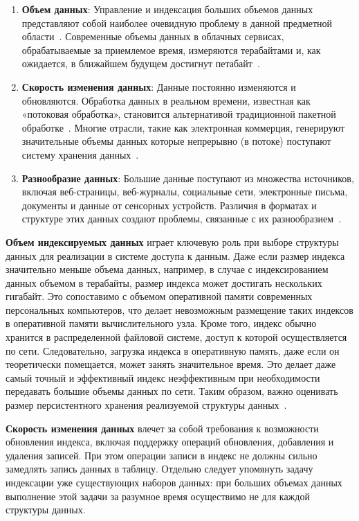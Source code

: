 \begin{enumerate}
    \item \textbf{Объем данных}: Управление и индексация больших объемов данных представляют собой наиболее очевидную проблему в данной предметной области~\cite{Big_data_challenge}. Современные объемы данных в облачных сервисах, обрабатываемые за приемлемое время, измеряются терабайтами и, как ожидается, в ближайшем будущем достигнут петабайт~\cite{Big_data_issues_challenges_tools}.
    \item \textbf{Скорость изменения данных}: Данные постоянно изменяются и обновляются. Обработка данных в реальном времени, известная как «потоковая обработка», становится альтернативой традиционной пакетной обработке~\cite{Big_data_challenge}. Многие отрасли, такие как электронная коммерция, генерируют значительные объемы данных которые непрерывно (в потоке) поступают систему хранения данных~\cite{Big_data_Issues_and_challenges}. 
    \item \textbf{Разнообразие данных}: Большие данные поступают из множества источников, включая веб-страницы, веб-журналы, социальные сети, электронные письма, документы и данные от сенсорных устройств. Различия в форматах и структуре этих данных создают проблемы, связанные с их разнообразием~\cite{Addressing_big_data_variety}.
\end{enumerate}

\textbf{Объем индексируемых данных} играет ключевую роль при выборе структуры данных для реализации в системе доступа к данным. Даже если размер индекса значительно меньше объема данных, например, в случае с индексированием данных объемом в терабайты, размер индекса может достигать нескольких гигабайт. Это сопоставимо с объемом оперативной памяти современных персональных компьютеров, что делает невозможным размещение таких индексов в оперативной памяти вычислительного узла. Кроме того, индекс обычно хранится в распределенной файловой системе, доступ к которой осуществляется по сети. Следовательно, загрузка индекса в оперативную память, даже если он теоретически помещается, может занять значительное время. Это делает даже самый точный и эффективный индекс неэффективным при необходимости передавать большие объемы данных по сети. Таким образом, важно оценивать размер персистентного хранения реализуемой структуры данных~\cite{Big_data_issues_challenges_tools}.

\textbf{Скорость изменения данных} влечет за собой требования к возможности обновления индекса, включая поддержку операций обновления, добавления и удаления записей. При этом операции записи в индекс не должны сильно замедлять запись данных в таблицу. Отдельно следует упомянуть задачу индексации уже существующих наборов данных: при больших объемах данных выполнение этой задачи за разумное время осуществимо не для каждой структуры данных.

